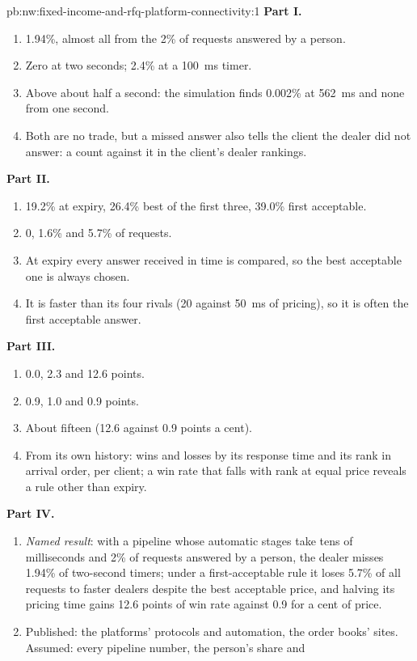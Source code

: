 \begin{solution}{pb:nw:fixed-income-and-rfq-platform-connectivity:1}
\textbf{Part I.}
\begin{enumerate}
\item 1.94\%, almost all from the 2\% of requests answered by a person.
\item Zero at two seconds; 2.4\% at a \qty{100}{\milli\second} timer.
\item Above about half a second: the simulation finds 0.002\% at \qty{562}{\milli\second} and none from one second.
\item Both are no trade, but a missed answer also tells the client the dealer did not answer: a count against it in the client's dealer
  rankings.
\end{enumerate}
\textbf{Part II.}
\begin{enumerate}[resume]
\item 19.2\% at expiry, 26.4\% best of the first three, 39.0\% first acceptable.
\item 0, 1.6\% and 5.7\% of requests.
\item At expiry every answer received in time is compared, so the best acceptable one is always chosen.
\item It is faster than its four rivals (20 against \qty{50}{\milli\second} of pricing), so it is often the first acceptable answer.
\end{enumerate}
\textbf{Part III.}
\begin{enumerate}[resume]
\item 0.0, 2.3 and 12.6 points.
\item 0.9, 1.0 and 0.9 points.
\item About fifteen (12.6 against 0.9 points a cent).
\item From its own history: wins and losses by its response time and its rank in arrival order, per client; a win rate that falls with
  rank at equal price reveals a rule other than expiry.
\end{enumerate}
\textbf{Part IV.}
\begin{enumerate}[resume]
\item \emph{Named result}: with a pipeline whose automatic stages take tens of milliseconds and 2\% of requests answered by a person,
  the dealer misses 1.94\% of two-second timers; under a first-acceptable rule it loses 5.7\% of all requests to faster dealers despite
  the best acceptable price, and halving its pricing time gains 12.6 points of win rate against 0.9 for a cent of price.
\item Published: the platforms' protocols and automation, the order books' sites. Assumed: every pipeline number, the person's share and

\end{enumerate}
\end{solution}

